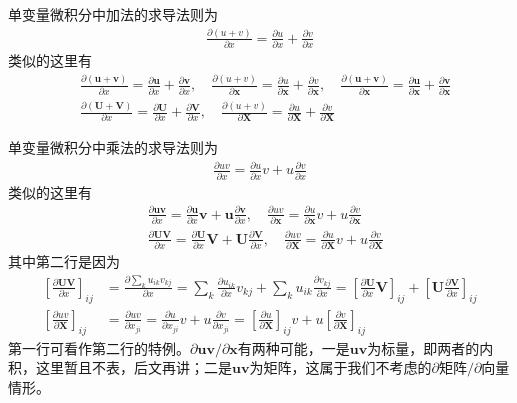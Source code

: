 \documentclass{ctexart}
\newcommand{\blue}[1]{\textcolor{Solarized-blue}{#1}}
\theoremstyle{definition}
\def \uv {\bm{u}}
\def \vv {\bm{v}}
\def \xv {\bm{x}}
\def \Uv {\mathbf{U}}
\def \Vv {\mathbf{V}}
\def \Xv {\mathbf{X}}
\begin{document}
单变量微积分中\blue{加法}的求导法则为
\begin{align*}
    \frac{\partial (u+v)}{\partial x} = \frac{\partial u}{\partial x} + \frac{\partial v}{\partial x}
\end{align*}
类似的这里有
\begin{align*}
     & \frac{\partial (\uv + \vv)}{\partial x} = \frac{\partial \uv}{\partial x} + \frac{\partial \vv}{\partial x}, \quad \frac{\partial (u+v)}{\partial \xv} = \frac{\partial u}{\partial \xv} + \frac{\partial v}{\partial \xv}, \quad \frac{\partial (\uv + \vv)}{\partial \xv} = \frac{\partial \uv}{\partial \xv} + \frac{\partial \vv}{\partial \xv} \\
     & \frac{\partial (\Uv + \Vv)}{\partial x} = \frac{\partial \Uv}{\partial x} + \frac{\partial \Vv}{\partial x}, \quad \frac{\partial (u + v)}{\partial \Xv} = \frac{\partial u}{\partial \Xv} + \frac{\partial v}{\partial \Xv}
\end{align*}

单变量微积分中\blue{乘法}的求导法则为
\begin{align*}
    \frac{\partial uv}{\partial x} = \frac{\partial u}{\partial x} v + u \frac{\partial v}{\partial x}
\end{align*}
类似的这里有
\begin{align*}
     & \frac{\partial \uv \vv}{\partial x} = \frac{\partial \uv}{\partial x} \vv + \uv \frac{\partial \vv}{\partial x}, \quad \frac{\partial uv}{\partial \xv} = \frac{\partial u}{\partial \xv} v + u \frac{\partial v}{\partial \xv} \\
     & \frac{\partial \Uv \Vv}{\partial x} = \frac{\partial \Uv}{\partial x} \Vv + \Uv \frac{\partial \Vv}{\partial x}, \quad \frac{\partial uv}{\partial \Xv} = \frac{\partial u}{\partial \Xv} v + u \frac{\partial v}{\partial \Xv}
\end{align*}
其中第二行是因为
\begin{align*}
    \left[ \frac{\partial \Uv \Vv}{\partial x} \right]_{ij} & = \frac{\partial \sum_k u_{ik} v_{kj}}{\partial x} = \sum_k \frac{\partial u_{ik}}{\partial x} v_{kj} + \sum_k u_{ik} \frac{\partial v_{kj}}{\partial x} = \left[ \frac{\partial \Uv}{\partial x} \Vv \right]_{ij} + \left[ \Uv \frac{\partial \Vv}{\partial x} \right]_{ij} \\
    \left[ \frac{\partial uv}{\partial \Xv} \right]_{ij}    & = \frac{\partial uv}{\partial x_{ji}} = \frac{\partial u}{\partial x_{ji}} v + u \frac{\partial v}{\partial x_{ji}} = \left[ \frac{\partial u}{\partial \Xv} \right]_{ij} v + u \left[ \frac{\partial v}{\partial \Xv} \right]_{ij}
\end{align*}
第一行可看作第二行的特例。$\partial \uv \vv / \partial \xv$有两种可能，一是$\uv \vv$为标量，即两者的内积，这里暂且不表，后文再讲；二是$\uv \vv$为矩阵，这属于我们不考虑的$\partial 矩阵 / \partial 向量$情形。
\end{document}

